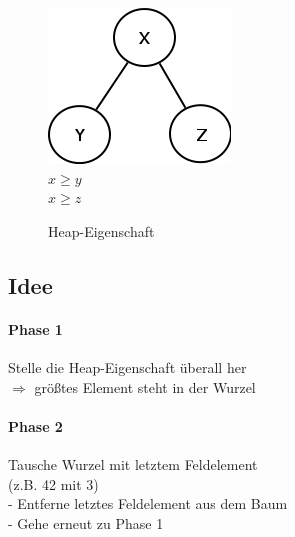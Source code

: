 \begin{figure}[h]
\begin{center}
\includegraphics[width=0.2\linewidth]{1/Grafik/HeapEigenschaft.png}\\
$x \geq y$\\
$x \geq z$
\caption{Heap-Eigenschaft}
\end{center}
\end{figure}


\subsection{Idee}
\paragraph{Phase 1} Stelle die Heap-Eigenschaft überall her\\
$\Rightarrow$ größtes Element steht in der Wurzel
\paragraph{Phase 2} Tausche Wurzel mit letztem Feldelement\\
(z.B. 42 mit 3)\\
- Entferne letztes Feldelement aus dem Baum\\
- Gehe erneut zu Phase 1
